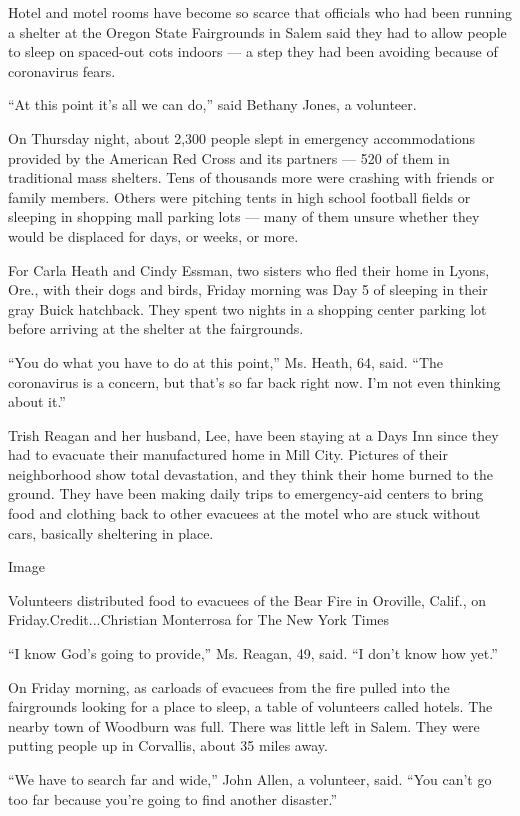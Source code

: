 Hotel and motel rooms have become so scarce that officials who had been
running a shelter at the Oregon State Fairgrounds in Salem said they had
to allow people to sleep on spaced-out cots indoors --- a step they had
been avoiding because of coronavirus fears.

``At this point it's all we can do,'' said Bethany Jones, a volunteer.

On Thursday night, about 2,300 people slept in emergency accommodations
provided by the American Red Cross and its partners --- 520 of them in
traditional mass shelters. Tens of thousands more were crashing with
friends or family members. Others were pitching tents in high school
football fields or sleeping in shopping mall parking lots --- many of
them unsure whether they would be displaced for days, or weeks, or more.

For Carla Heath and Cindy Essman, two sisters who fled their home in
Lyons, Ore., with their dogs and birds, Friday morning was Day 5 of
sleeping in their gray Buick hatchback. They spent two nights in a
shopping center parking lot before arriving at the shelter at the
fairgrounds.

``You do what you have to do at this point,'' Ms. Heath, 64, said. ``The
coronavirus is a concern, but that's so far back right now. I'm not even
thinking about it.''

Trish Reagan and her husband, Lee, have been staying at a Days Inn since
they had to evacuate their manufactured home in Mill City. Pictures of
their neighborhood show total devastation, and they think their home
burned to the ground. They have been making daily trips to emergency-aid
centers to bring food and clothing back to other evacuees at the motel
who are stuck without cars, basically sheltering in place.

Image

Volunteers distributed food to evacuees of the Bear Fire in Oroville,
Calif., on Friday.Credit...Christian Monterrosa for The New York Times

``I know God's going to provide,'' Ms. Reagan, 49, said. ``I don't know
how yet.''

On Friday morning, as carloads of evacuees from the fire pulled into the
fairgrounds looking for a place to sleep, a table of volunteers called
hotels. The nearby town of Woodburn was full. There was little left in
Salem. They were putting people up in Corvallis, about 35 miles away.

``We have to search far and wide,'' John Allen, a volunteer, said. ``You
can't go too far because you're going to find another disaster.''

